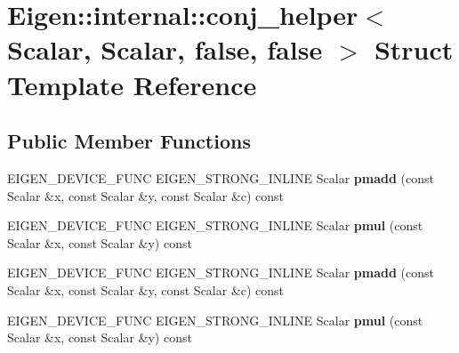 \hypertarget{struct_eigen_1_1internal_1_1conj__helper_3_01_scalar_00_01_scalar_00_01false_00_01false_01_4}{}\section{Eigen\+:\+:internal\+:\+:conj\+\_\+helper$<$ Scalar, Scalar, false, false $>$ Struct Template Reference}
\label{struct_eigen_1_1internal_1_1conj__helper_3_01_scalar_00_01_scalar_00_01false_00_01false_01_4}
\subsection*{Public Member Functions}
\begin{DoxyCompactItemize}
\item 
\mbox{\label{struct_eigen_1_1internal_1_1conj__helper_3_01_scalar_00_01_scalar_00_01false_00_01false_01_4_a749c17e88cf10d2475791f45277cc803}} 
E\+I\+G\+E\+N\+\_\+\+D\+E\+V\+I\+C\+E\+\_\+\+F\+U\+NC E\+I\+G\+E\+N\+\_\+\+S\+T\+R\+O\+N\+G\+\_\+\+I\+N\+L\+I\+NE Scalar {\bfseries pmadd} (const Scalar \&x, const Scalar \&y, const Scalar \&c) const
\item 
\mbox{\label{struct_eigen_1_1internal_1_1conj__helper_3_01_scalar_00_01_scalar_00_01false_00_01false_01_4_a983d0e335017e8db84b32b99074708e5}} 
E\+I\+G\+E\+N\+\_\+\+D\+E\+V\+I\+C\+E\+\_\+\+F\+U\+NC E\+I\+G\+E\+N\+\_\+\+S\+T\+R\+O\+N\+G\+\_\+\+I\+N\+L\+I\+NE Scalar {\bfseries pmul} (const Scalar \&x, const Scalar \&y) const
\item 
\mbox{\label{struct_eigen_1_1internal_1_1conj__helper_3_01_scalar_00_01_scalar_00_01false_00_01false_01_4_a749c17e88cf10d2475791f45277cc803}} 
E\+I\+G\+E\+N\+\_\+\+D\+E\+V\+I\+C\+E\+\_\+\+F\+U\+NC E\+I\+G\+E\+N\+\_\+\+S\+T\+R\+O\+N\+G\+\_\+\+I\+N\+L\+I\+NE Scalar {\bfseries pmadd} (const Scalar \&x, const Scalar \&y, const Scalar \&c) const
\item 
\mbox{\label{struct_eigen_1_1internal_1_1conj__helper_3_01_scalar_00_01_scalar_00_01false_00_01false_01_4_a983d0e335017e8db84b32b99074708e5}} 
E\+I\+G\+E\+N\+\_\+\+D\+E\+V\+I\+C\+E\+\_\+\+F\+U\+NC E\+I\+G\+E\+N\+\_\+\+S\+T\+R\+O\+N\+G\+\_\+\+I\+N\+L\+I\+NE Scalar {\bfseries pmul} (const Scalar \&x, const Scalar \&y) const
\end{DoxyCompactItemize}


